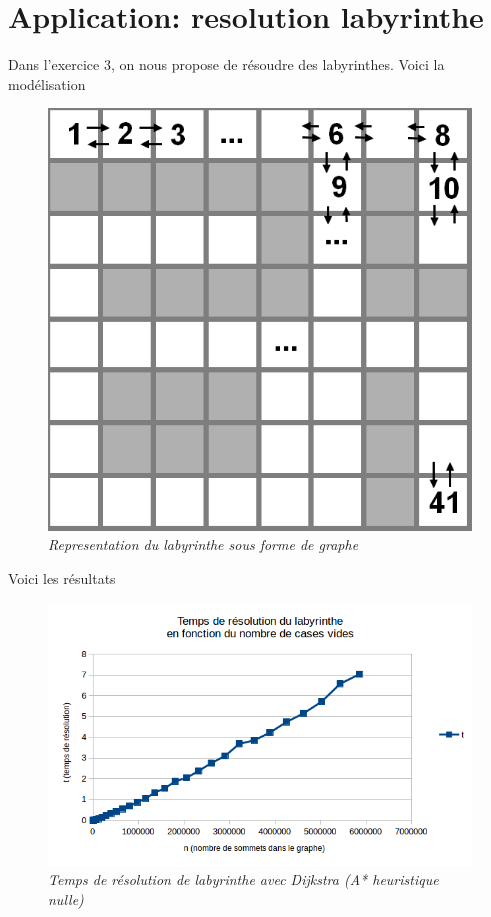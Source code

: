 \documentclass[10pt]{article}
\begin{document}
	\section{Application: resolution labyrinthe}
		Dans l'exercice 3, on nous propose de résoudre des labyrinthes.
		Voici la modélisation
		\begin{figure}[H]
			\begin{center}
				\includegraphics[width=12cm,height=\textheight,keepaspectratio]{./images/lab.png}
			\end{center}
			\caption{\textit{Representation du labyrinthe sous forme de graphe}}
		\end{figure}
		Voici les résultats 
		\begin{figure}[H]
			\begin{center}
				\includegraphics[width=12cm,height=\textheight,keepaspectratio]{./images/courbe_temps.png}
			\end{center}
			\caption{\textit{Temps de résolution de labyrinthe avec Dijkstra (A* heuristique nulle)}}
		\end{figure}
\end{document}
